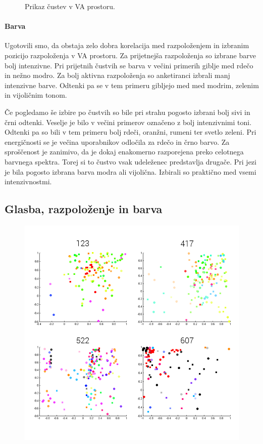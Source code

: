 \documentclass[a4paper, 12pt]{book}
\begin{document}
{\begin{figure}[hbt]
\caption{Prikaz čustev v VA prostoru.}
\label{moodperception}
\end{figure} 

\paragraph{Barva}

Ugotovili smo, da obstaja zelo dobra korelacija med razpoloženjem in izbranim pozicijo razpoloženja v VA prostoru. Za prijetnejša razpoloženja so izbrane barve bolj intenzivne. Pri prijetnih čustvih se barva v večini primerih giblje med rdečo in nežno modro. Za bolj aktivna razpoloženja so anketiranci izbrali manj intenzivne barve. Odtenki pa se v tem primeru gibljejo med med modrim, zelenim in vijoličnim tonom. 

Če pogledamo še izbire po čustvih so bile pri strahu pogosto izbrani bolj sivi in črni odtenki. Veselje je bilo v večini primerov označeno z bolj intenzivnimi toni. Odtenki pa so bili v tem primeru bolj rdeči, oranžni, rumeni ter svetlo zeleni. Pri energičnosti se je večina uporabnikov odločila za rdečo in črno barvo. Za sproščenost je zanimivo, da je dokaj enakomerno razporejena preko celotnega barvnega spektra. Torej si to čustvo vsak udeleženec predstavlja drugače. Pri jezi je bila pogosto izbrana barva modra ali vijolična. Izbirali so praktično med vsemi intenzivnostmi.

\subsection{Glasba, razpoloženje in barva}

\begin{figure}[hbt]
\centering
\includegraphics[width=13cm]{images/moodmusic.png}


\end{figure}}
\end{document}
